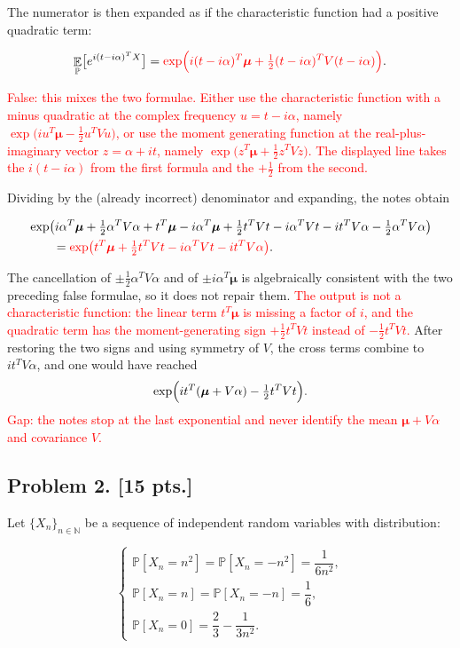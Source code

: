 \documentclass[11pt,a4paper]{article}
\newcommand{\mserr}[1]{\textcolor{red}{#1}}
\DeclareMathOperator{\E}{\mathbb{E}}
\begin{document}
The numerator is then expanded as if the characteristic function had a positive quadratic term:

\[
\E_{\mathbb{P}}\bigl[e^{i(t-i\alpha)^{T}X}\bigr]
=
\mserr{\exp\Bigl(
i(t-i\alpha)^{T}\bm{\mu}
+
\tfrac12(t-i\alpha)^{T}V(t-i\alpha)
\Bigr)}.
\]

\mserr{False: this mixes the two formulae. Either use the characteristic function with a minus quadratic at the complex frequency \(u=t-i\alpha\), namely \(\exp\bigl(iu^{T}\bm{\mu}-\frac12 u^{T}Vu\bigr)\), or use the moment generating function at the real-plus-imaginary vector \(z=\alpha+it\), namely \(\exp\bigl(z^{T}\bm{\mu}+\frac12 z^{T}Vz\bigr)\). The displayed line takes the \(i(t-i\alpha)\) from the first formula and the \(+\frac12\) from the second.}

Dividing by the (already incorrect) denominator and expanding, the notes obtain

\[
\begin{aligned}
&\exp\bigl(
i\alpha^{T}\bm{\mu}
+
\tfrac12\alpha^{T}V\alpha
+
t^{T}\bm{\mu}
-
i\alpha^{T}\bm{\mu}
+
\tfrac12 t^{T}Vt
-
i\alpha^{T}Vt
-
it^{T}V\alpha
-
\tfrac12\alpha^{T}V\alpha
\bigr)
\\
&\qquad=
\mserr{\exp\bigl(
t^{T}\bm{\mu}
+
\tfrac12 t^{T}Vt
-
i\alpha^{T}Vt
-
it^{T}V\alpha
\bigr)}.
\end{aligned}
\]

The cancellation of \(\pm\frac12\alpha^{T}V\alpha\) and of \(\pm i\alpha^{T}\bm{\mu}\) is algebraically consistent with the two preceding false formulae, so it does not repair them. \mserr{The output is not a characteristic function: the linear term \(t^{T}\bm{\mu}\) is missing a factor of \(i\), and the quadratic term has the moment-generating sign \(+\frac12 t^{T}Vt\) instead of \(-\frac12 t^{T}Vt\).} After restoring the two signs and using symmetry of \(V\), the cross terms combine to \(it^{T}V\alpha\), and one would have reached
\[
\exp\Bigl(it^{T}(\bm{\mu}+V\alpha)-\tfrac12 t^{T}Vt\Bigr).
\]
\mserr{Gap: the notes stop at the last exponential and never identify the mean \(\bm{\mu}+V\alpha\) and covariance \(V\).}

\subsection{Problem 2. [15 pts.]}
Let \( \{X_n\}_{n \in \mathbb{N}} \) be a sequence of independent random variables with distribution:

\[
\begin{cases}
\mathbb{P}[X_n = n^2] = \mathbb{P}[X_n = -n^2] = \dfrac{1}{6n^2}, \\[0.6em]
\mathbb{P}[X_n = n] = \mathbb{P}[X_n = -n] = \dfrac{1}{6}, \\[0.6em]
\mathbb{P}[X_n = 0] = \dfrac{2}{3} - \dfrac{1}{3n^2}.
\end{cases}
\]
\end{document}
